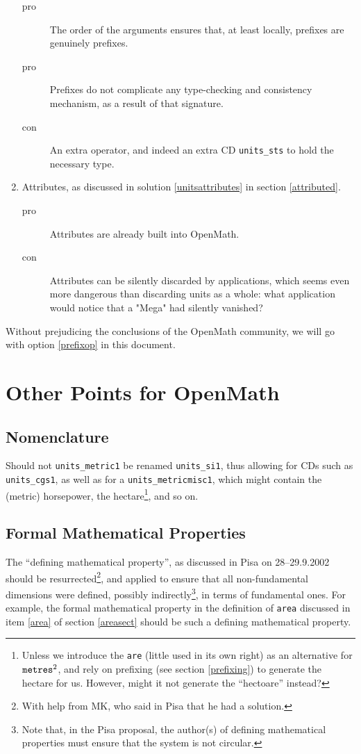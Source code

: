 \documentclass[11pt]{openmathTN}
\def\action#1{\hfill\rlap{\bf #1}}
\begin{document}
\begin{enumerate}
\begin{description}
\item[pro]The order of the arguments ensures that, at least locally,
prefixes are genuinely prefixes.
\item[pro]Prefixes do not complicate any type-checking and consistency
mechanism, as a result of that signature.
\item[con]An extra operator, and indeed an extra CD \verb+units_sts+ to
hold the necessary type.
\end{description}
\item Attributes, as discussed in solution \ref{unitsattributes} in section
\ref{attributed}.
\begin{description}
\item[pro]Attributes are already built into OpenMath.
\item[con]Attributes can be silently discarded by applications, which seems
even more dangerous than discarding units as a whole: what application
would notice that a "Mega" had silently vanished?
\end{description}
\end{enumerate}
Without prejudicing the conclusions of the OpenMath community, we will go
with option \ref{prefixop} in this document.
\section{Other Points for OpenMath}\label{OMqueries}
\subsection{Nomenclature}
Should not {\tt units\_metric1} be renamed {\tt units\_si1}, thus allowing
for CDs such as \verb+units_cgs1+, as well as for a
\verb+units_metricmisc1+, which might contain the (metric) horsepower, the
hectare\footnote{Unless we introduce the {\tt are} (little used in its own
right) as an alternative for ${\tt metres}^2$, and rely on prefixing (see
section \ref{prefixing}) to generate the hectare for us. However, might it
not generate the ``hectoare'' instead?}, and so on.
\subsection{Formal Mathematical Properties}
The ``defining mathematical property'', as discussed in Pisa on
28--29.9.2002 should be resurrected\footnote{\label{MKnote}With help from
MK, who said in Pisa that he had a solution.}, and applied to ensure that
all non-fundamental dimensions were defined, possibly indirectly\footnote{Note
that, in the Pisa proposal, the author(s) of defining mathematical
properties must ensure that the system is not circular.}, in terms of
fundamental ones. For example, the formal mathematical property in the
definition of {\tt area} discussed in item \ref{area} of section
\ref{areasect} should be such a defining mathematical
property.\action{JHD$\strut^{\ref{MKnote}}$}
\end{document}
